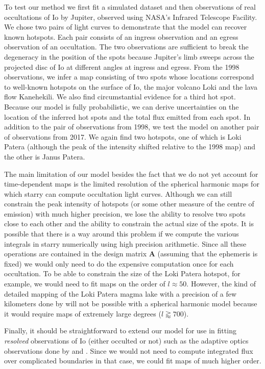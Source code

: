 \documentclass[12pt,dvipsnames]{report}
\begin{document}
To test our method we first fit a simulated dataset and then observations of real occultations of Io by Jupiter, observed using NASA's Infrared Telescope Facility.
We chose two pairs of light curves to demonstrate that the model can recover known hotspots.
Each pair consists of an ingress observation and an egress observation of an occultation. 
The two observations are sufficient to break the degeneracy in the position of the spots because Jupiter's limb sweeps across the projected disc of Io at different angles at ingress and egress.
From the 1998 observations, we infer a map consisting of two spots whose locations correspond to well-known hotspots on the surface of Io, the major volcano Loki and the lava flow Kanehekili.
We also find circumstantial evidence for a third hot spot.
Because our model is fully probabilistic, we can derive uncertainties on the location of the inferred hot spots and the total flux emitted from each spot.
In addition to the pair of observations from 1998, we test the model on another pair of observations from 2017.
We again find two hotspots, one of which is Loki Patera (although the peak of the intensity shifted relative to the 1998 map) and the other is Janus Patera.

The main limitation of our model besides the fact that we do not yet account for 
time-dependent maps is the limited resolution of the spherical harmonic maps for 
which \textsf{starry} can compute occultation light curves.
Although we can still constrain the peak intensity of hotspots (or some other measure 
of the centre of emission) with much higher precision, we lose the ability to resolve 
two spots close to each other and the ability to constrain the actual size of the spots. 
It is possible that there is a way around this problem if we compute the various integrals 
in \textsf{starry} numerically using high precision arithmetic.
Since all these operations are contained in the design matrix $\mathbf{A}$ (assuming 
that the ephemeris is fixed) we would only need to do the expensive computation once 
for each occultation.
To be able to constrain the size of the Loki Patera hotspot, for example, we would need 
to fit maps on the order of $l\approx 50$.
However, the kind of detailed mapping of the Loki Patera magma lake with a precision 
of a few kilometers done by \citet{2017Natur.545..199D} will not be possible with a 
spherical harmonic model because it would require maps of extremely large degrees 
($l\gtrapprox 700$).

Finally, it should be straightforward to extend our model for use in fitting 
\emph{resolved} observations of Io (either occulted or not) such as the adaptive 
optics observations done by \citet{2016Icar..280..405D} and \citet{2016Icar..280..378D}.
Since we would not need to compute integrated flux over complicated boundaries in 
that case, we could fit maps of much higher order.
\end{document}
